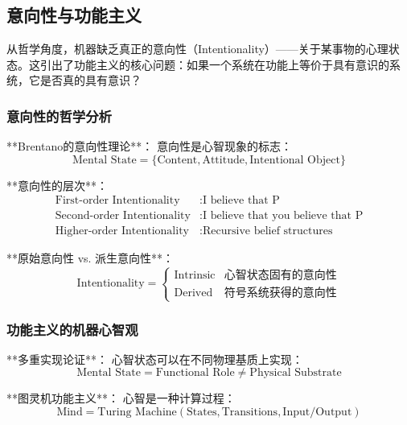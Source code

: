 \subsection{意向性与功能主义}

从哲学角度，机器缺乏真正的意向性（Intentionality）——关于某事物的心理状态。这引出了功能主义的核心问题：如果一个系统在功能上等价于具有意识的系统，它是否真的具有意识？

\subsubsection{意向性的哲学分析} %

**Brentano的意向性理论**：
意向性是心智现象的标志：
\begin{equation}
\text{Mental State} = \{\text{Content}, \text{Attitude}, \text{Intentional Object}\}
\end{equation}

**意向性的层次**：
\begin{align}
\text{First-order Intentionality} &: \text{I believe that P} \\
\text{Second-order Intentionality} &: \text{I believe that you believe that P} \\
\text{Higher-order Intentionality} &: \text{Recursive belief structures}
\end{align}

**原始意向性 vs. 派生意向性**：
\begin{equation}
\text{Intentionality} = \begin{cases}
\text{Intrinsic} & \text{心智状态固有的意向性} \\
\text{Derived} & \text{符号系统获得的意向性}
\end{cases}
\end{equation}

\subsubsection{功能主义的机器心智观} %

**多重实现论证**：
心智状态可以在不同物理基质上实现：
\begin{equation}
\text{Mental State} = \text{Functional Role} \neq \text{Physical Substrate}
\end{equation}

**图灵机功能主义**：
心智是一种计算过程：
\begin{equation}
\text{Mind} = \text{Turing Machine}(\text{States}, \text{Transitions}, \text{Input/Output})
\end{equation}

